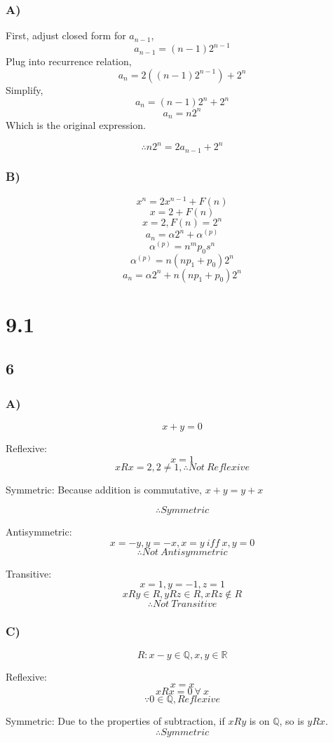 \documentclass[journal]{IEEEtran}
\begin{document}
\subsubsection*{A)}
First, adjust closed form for $a_{n-1}$,
$$a_{n-1} = (n-1)2^{n-1}$$
Plug into recurrence relation,
$$a_n = 2((n-1)2^{n-1}) + 2^n$$
Simplify,
$$a_n = (n-1)2^{n} + 2^n$$
$$a_n = n2^{n}$$
Which is the original expression. 

$$\boxed{\therefore n2^{n} = 2a_{n-1} + 2^n}$$

\subsubsection*{B)}
$$x^n = 2x^{n-1} + F(n)$$
$$x = 2 + F(n)$$
$$x = 2, F(n) = 2^n$$
$$a_n = \alpha 2^n + \alpha ^(p)$$
$$\alpha ^(p) = n^m p_0 s^n$$
$$\alpha ^(p) = n(n p_1 + p_0) 2^n$$
$$\boxed{a_n = \alpha 2^n + n(n p_1 + p_0) 2^n}$$

\section*{9.1}
\subsection*{6}
\subsubsection*{A)}
$$x + y = 0$$

Reflexive:
$$x = 1$$
$$xRx = 2, 2 \neq 1, \therefore \boxed{Not~Reflexive}$$

Symmetric:
Because addition is commutative, $x+y = y+x$

$$\therefore \boxed{Symmetric}$$

Antisymmetric:
$$x = -y, y = -x, x = y~iff~x,y=0$$
$$\therefore \boxed{Not~Antisymmetric}$$

Transitive:
$$x = 1, y = -1, z = 1$$
$$xRy \in R,  yRz \in R, xRz \notin R$$
$$\therefore \boxed{Not~Transitive}$$


\subsubsection*{C)}
$$R: x-y \in \mathbb{Q}, x, y \in \mathbb{R}$$

Reflexive:
$$x = x$$
$$xRx = 0~\forall~x$$
$$\because 0 \in \mathbb{Q}, \boxed{Reflexive}$$

Symmetric:
Due to the properties of subtraction, if $xRy$ is on 
$\mathbb{Q}$, so is $yRx$.
$$\therefore \boxed{Symmetric}$$
\end{document}
